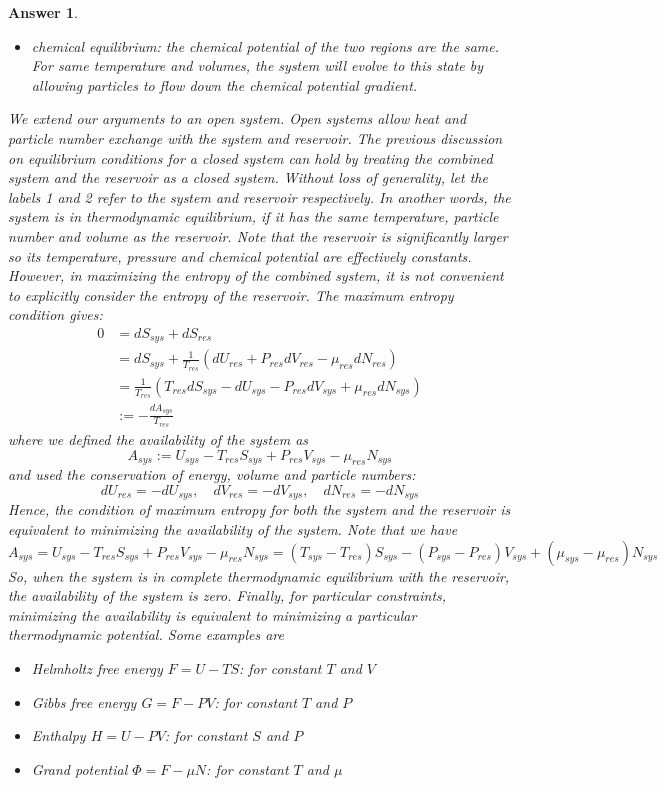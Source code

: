 \documentclass[a4paper]{article}
\newtheorem{ans}{Answer}[section]
\theoremstyle{new}
\begin{document}
\begin{ans}
\begin{itemize}
    \item chemical equilibrium: the chemical potential of the two regions are the same. For same temperature and volumes, the system will evolve to this state by allowing particles to flow down the chemical potential gradient.
\end{itemize}
We extend our arguments to an open system. Open systems allow heat and particle number exchange with the system and reservoir. The previous discussion on equilibrium conditions for a closed system can hold by treating the combined system and the reservoir as a closed system. Without loss of generality, let the labels 1 and 2 refer to the system and reservoir respectively. In another words, the system is in thermodynamic equilibrium, if it has the same temperature, particle number and volume as the reservoir. Note that the reservoir is significantly larger so its temperature, pressure and chemical potential are effectively constants.\\[5pt]
However, in maximizing the entropy of the combined system, it is not convenient to explicitly consider the entropy of the reservoir. The maximum entropy condition gives:
\begin{align}
    0&=dS_{sys}+dS_{res}\nonumber\\&=dS_{sys}+\frac{1}{T_{res}}(dU_{res}+P_{res}dV_{res}-\mu_{res}dN_{res})\nonumber\\&=\frac{1}{T_{res}}(T_{res}dS_{sys}-dU_{sys}-P_{res}dV_{sys}+\mu_{res}dN_{sys})\nonumber\\&:=-\frac{dA_{sys}}{T_{res}}\nonumber
\end{align}
where we defined the availability of the system as
$$A_{sys}:=U_{sys}-T_{res}S_{sys}+P_{res}V_{sys}-\mu_{res}N_{sys}$$
and used the conservation of energy, volume and particle numbers:
$$dU_{res}=-dU_{sys},\quad dV_{res}=-dV_{sys},\quad dN_{res}=-dN_{sys}$$
Hence, the condition of maximum entropy for both the system and the reservoir is equivalent to minimizing the availability of the system. Note that we have
$$A_{sys}=U_{sys}-T_{res}S_{sys}+P_{res}V_{sys}-\mu_{res}N_{sys}=(T_{sys}-T_{res})S_{sys}-(P_{sys}-P_{res})V_{sys}+(\mu_{sys}-\mu_{res})N_{sys}$$
So, when the system is in complete thermodynamic equilibrium with the reservoir, the availability of the system is zero. Finally, for particular constraints, minimizing the availability is equivalent to minimizing a particular thermodynamic potential. Some examples are
\begin{itemize}
    \item Helmholtz free energy $F=U-TS$: for constant $T$ and $V$
    \item Gibbs free energy $G=F-PV$: for constant $T$ and $P$
    \item Enthalpy $H=U-PV$: for constant $S$ and $P$
    \item Grand potential $\Phi=F-\mu N$: for constant $T$ and $\mu$
\end{itemize}
\end{ans}
\end{document}
